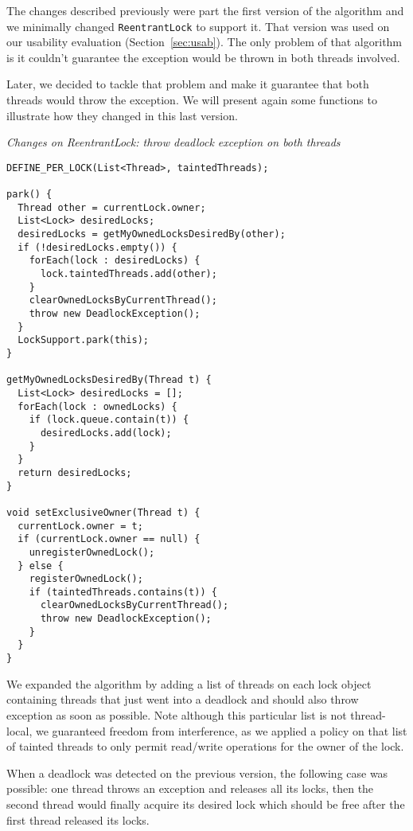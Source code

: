 The changes described previously were part the first version of the algorithm and we minimally changed {\tt ReentrantLock} to support it.
That version was used on our usability evaluation (Section~\ref{sec:usab}).
The only problem of that algorithm is it couldn't guarantee the exception would be thrown in both threads involved.

Later, we decided to tackle that problem and make it guarantee that both threads would throw the exception.
We will present again some functions to illustrate how they changed in this last version.

\medskip
\noindent
{\it Changes on ReentrantLock: throw deadlock exception on both threads}
\begin{verbatim}
DEFINE_PER_LOCK(List<Thread>, taintedThreads);

park() {
  Thread other = currentLock.owner;
  List<Lock> desiredLocks;
  desiredLocks = getMyOwnedLocksDesiredBy(other);
  if (!desiredLocks.empty()) {
    forEach(lock : desiredLocks) {
      lock.taintedThreads.add(other);
    }
    clearOwnedLocksByCurrentThread();
    throw new DeadlockException();
  }
  LockSupport.park(this);
}

getMyOwnedLocksDesiredBy(Thread t) {
  List<Lock> desiredLocks = [];
  forEach(lock : ownedLocks) {
    if (lock.queue.contain(t)) {
      desiredLocks.add(lock);
    }
  }
  return desiredLocks;
}

void setExclusiveOwner(Thread t) {
  currentLock.owner = t;
  if (currentLock.owner == null) {
    unregisterOwnedLock();
  } else {
    registerOwnedLock();
    if (taintedThreads.contains(t)) {
      clearOwnedLocksByCurrentThread();
      throw new DeadlockException();
    }
  }
}

\end{verbatim}

We expanded the algorithm by adding a list of threads on each lock object containing threads that just went into a deadlock and should also throw exception as soon as possible.
Note although this particular list is not thread-local, we guaranteed freedom from interference,
as we applied a policy on that list of tainted threads to only permit read/write operations for the owner of the lock.

When a deadlock was detected on the previous version, the following case was possible:
one thread throws an exception and releases all its locks,
then the second thread would finally acquire its desired lock
which should be free after the first thread released its locks.

